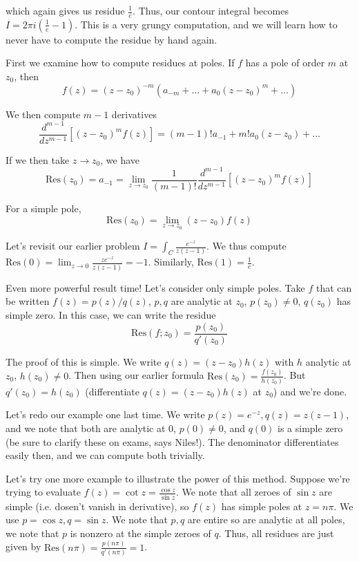 \documentclass[10pt]{report}
\newcommand{\Res}[0]{\mathrm{Res} }
\begin{document}
which again gives us residue $\frac{1}{e}$. Thus, our contour integral becomes $I = 2\pi i\left( \frac{1}{e} - 1 \right)$. This is a very grungy computation, and we will learn how to never have to compute the residue by hand again. 

First we examine how to compute residues at poles. If $f$ has a pole of order $m$ at $z_0$, then 
$$f(z) = (z-z_0)^{-m}\left( a_{-m} + \dots + a_0(z-z_0)^m + \dots\right)$$

We then compute $m-1$ derivatives
$$\frac{d^{m-1}}{dz^{m-1}}\left[ (z-z_0)^mf(z) \right] = (m-1)!a_{-1} + m!a_0(z-z_0) +\dots$$

If we then take $z \to z_0$, we have
$$\Res(z_0) = a_{-1} = \lim_{z \to z_0}\frac{1}{(m-1)!} \frac{d^{m-1}}{dz^{m-1}}\left[ (z-z_0)^mf(z) \right]$$

For a simple pole,
$$\Res(z_0) = \lim_{z\to z_0} (z-z_0)f(z)$$

Let's revisit our earlier problem $I = \int_C \frac{e^{-z}}{z(z-1)}$. We thus compute $\Res(0) = \lim_{z\to0} \frac{ze^{-z}}{z(z-1)} = -1$. Similarly, $\Res(1) = \frac{1}{e}$. 

Even more powerful result time! Let's consider only simple poles. Take $f$ that can be written $f(z) = p(z)/q(z)$, $p,q$ are analytic at $z_0$, $p(z_0) \neq 0$, $q(z_0)$ has simple zero. In this case, we can write the residue
$$\Res(f;z_0) = \frac{p(z_0)}{q'(z_0)}$$

The proof of this is simple. We write $q(z) = (z-z_0)h(z)$ with $h$ analytic at $z_0$, $h(z_0) \neq 0$. Then using our earlier formula $\Res(z_0) = \frac{f(z_0)}{h(z_0)}$. But $q'(z_0) = h(z_0)$ (differentiate $q(z) = (z-z_0)h(z)$ at $z_0$) and we're done.

Let's redo our example one last time. We write $p(z) = e^{-z}, q(z) = z(z-1)$, and we note that both are analytic at $0$, $p(0) \neq 0$, and $q(0)$ is a simple zero (be sure to clarify these on exams, says Niles!). The denominator differentiates easily then, and we can compute both trivially.

Let's try one more example to illustrate the power of this method. Suppose we're trying to evaluate $f(z) = \cot z = \frac{\cos z}{\sin z}$. We note that all zeroes of $\sin z$ are simple (i.e. dosen't vanish in derivative), so $f(z)$ has simple poles at $z=n\pi$. We use $p=\cos z, q = \sin z$. We note that $p,q$ are entire so are analytic at all poles, we note that $p$ is nonzero at the simple zeroes of $q$. Thus, all residues are just given by $\Res(n\pi) = \frac{p(n\pi)}{q'(n\pi)} = 1$. 
\end{document}
